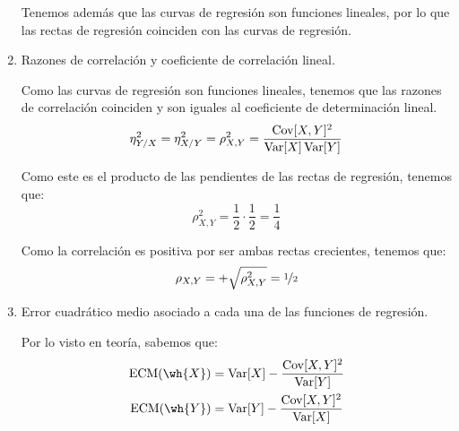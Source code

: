 \begin{ejercicio}
\begin{enumerate}
        Tenemos además que las curvas de regresión son funciones lineales, por lo que las rectas de regresión coinciden con las curvas de regresión.
        \item Razones de correlación y coeficiente de correlación lineal.
        
        Como las curvas de regresión son funciones lineales, tenemos que las razones de correlación coinciden y son iguales al coeficiente de determinación lineal.
        \begin{equation*}
            \eta_{Y/X}^2 = \eta_{X/Y}^2 = \rho_{X,Y}^2 = \dfrac{\operatorname{Cov}[X,Y]^2}{\operatorname{Var}[X]\operatorname{Var}[Y]}
        \end{equation*}
        
        Como este es el producto de las pendientes de las rectas de regresión, tenemos que:
        \begin{equation*}
            \rho_{X,Y}^2 = \dfrac{1}{2}\cdot \dfrac{1}{2} = \dfrac{1}{4}
        \end{equation*}

        Como la correlación es positiva por ser ambas rectas crecientes, tenemos que:
        \begin{equation*}
            \rho_{X,Y} =  + \sqrt{\rho_{X,Y}^2} = \nicefrac{1}{2}
        \end{equation*}

        \item Error cuadrático medio asociado a cada una de las funciones de regresión.
        
        Por lo visto en teoría, sabemos que:
        \begin{align*}
            \text{ECM}(\wh{X}) &= \Var[X] - \dfrac{\Cov[X,Y]^2}{\Var[Y]}\\
            \text{ECM}(\wh{Y}) &= \Var[Y] - \dfrac{\Cov[X,Y]^2}{\Var[X]}
        \end{align*}


\end{enumerate}
\end{ejercicio}
